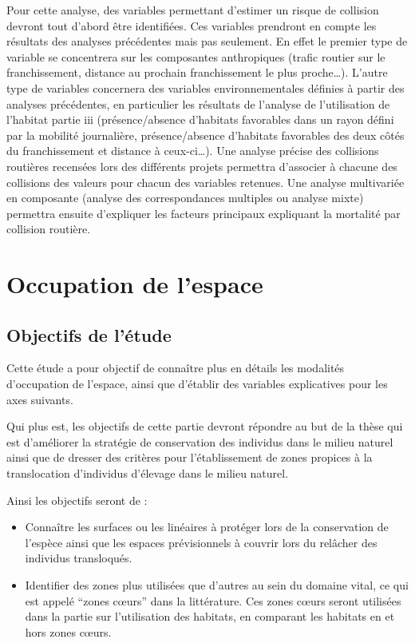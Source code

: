 \documentclass[
  letterpaper,
  DIV=11,
  numbers=noendperiod]{scrreprt}
\providecommand{\tightlist}{%
  \setlength{\itemsep}{0pt}\setlength{\parskip}{0pt}}\usepackage{longtable,booktabs,array}
\begin{document}
Pour cette analyse, des variables permettant d'estimer un risque de
collision devront tout d'abord être identifiées. Ces variables prendront
en compte les résultats des analyses précédentes mais pas seulement. En
effet le premier type de variable se concentrera sur les composantes
anthropiques (trafic routier sur le franchissement, distance au prochain
franchissement le plus proche\ldots). L'autre type de variables
concernera des variables environnementales définies à partir des
analyses précédentes, en particulier les résultats de l'analyse de
l'utilisation de l'habitat partie iii (présence/absence d'habitats
favorables dans un rayon défini par la mobilité journalière,
présence/absence d'habitats favorables des deux côtés du franchissement
et distance à ceux-ci\ldots). Une analyse précise des collisions
routières recensées lors des différents projets permettra d'associer à
chacune des collisions des valeurs pour chacun des variables retenues.
Une analyse multivariée en composante (analyse des correspondances
multiples ou analyse mixte) permettra ensuite d'expliquer les facteurs
principaux expliquant la mortalité par collision routière.

\chapter{Occupation de l'espace}\label{occupation-de-lespace-1}

\section{Objectifs de l'étude}\label{objectifs-de-luxe9tude}

Cette étude a pour objectif de connaître plus en détails les modalités
d'occupation de l'espace, ainsi que d'établir des variables explicatives
pour les axes suivants.

Qui plus est, les objectifs de cette partie devront répondre au but de
la thèse qui est d'améliorer la stratégie de conservation des individus
dans le milieu naturel ainsi que de dresser des critères pour
l'établissement de zones propices à la translocation d'individus
d'élevage dans le milieu naturel.

Ainsi les objectifs seront de :

\begin{itemize}
\tightlist
\item
  Connaître les surfaces ou les linéaires à protéger lors de la
  conservation de l'espèce ainsi que les espaces prévisionnels à couvrir
  lors du relâcher des individus transloqués.
\item
  Identifier des zones plus utilisées que d'autres au sein du domaine
  vital, ce qui est appelé ``zones cœurs'' dans la littérature. Ces
  zones cœurs seront utilisées dans la partie sur l'utilisation des
  habitats, en comparant les habitats en et hors zones cœurs.
\end{itemize}
\end{document}
